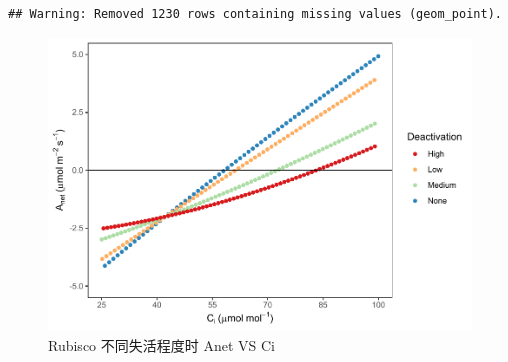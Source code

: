 \documentclass[
]{krantz}
\begin{document}
\begin{verbatim}
## Warning: Removed 1230 rows containing missing values (geom_point).
\end{verbatim}

\begin{figure}
\centering
\includegraphics{bookdown_files/figure-latex/anetdecci-1.pdf}
\caption{\label{fig:anetdecci}Rubisco 不同失活程度时 Anet VS Ci}
\end{figure}
\end{document}
